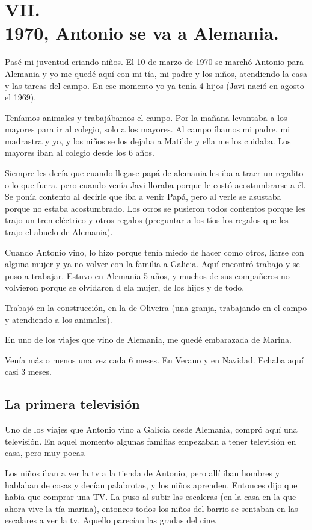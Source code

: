 \documentclass[12pt,a5paper]{book}
\begin{document}
\section*{VII.\\1970, Antonio se va a Alemania.}

Pasé mi juventud criando niños. El 10 de marzo de 1970 se marchó Antonio para Alemania y yo me quedé aquí con mi tía, mi padre y los niños, atendiendo la casa y las tareas del campo. En ese momento yo ya tenía 4 hijos (Javi nació en agosto el 1969).

Teníamos animales y trabajábamos el campo. Por la mañana levantaba a los mayores para ir al colegio, solo a los mayores. Al campo íbamos mi padre, mi madrastra y yo, y los niños se los dejaba a Matilde y ella me los cuidaba. Los mayores iban al colegio desde los 6 años.

Siempre les decía que cuando llegase papá de alemania les iba a traer un regalito o lo que fuera, pero cuando venía Javi lloraba porque le costó acostumbrarse a él. Se ponía contento al decirle que iba a venir Papá, pero al verle se asustaba porque no estaba acostumbrado. Los otros se pusieron todos contentos porque les trajo un tren eléctrico y otros regalos (preguntar a los tíos los regalos que les trajo el abuelo de Alemania). 

Cuando Antonio vino, lo hizo porque tenía miedo de hacer como otros, liarse con alguna mujer y ya no volver con la familia a Galicia. Aquí encontró trabajo y se puso a trabajar. Estuvo en Alemania 5 años, y muchos de sus compañeros no volvieron porque se olvidaron d ela mujer, de los hijos y de todo.

Trabajó en la construcción, en la de Oliveira (una granja, trabajando en el campo y atendiendo a los animales).

En uno de los viajes que vino de Alemania, me quedé embarazada de Marina.

Venía más o menos una vez cada 6 meses. En Verano y en Navidad. Echaba aquí casi 3 meses.


\subsection*{La primera televisión}

Uno de los viajes que Antonio vino a Galicia desde Alemania, compró aquí una televisión. En aquel momento algunas familias empezaban a tener televisión en casa, pero muy pocas.

Los niños iban a ver la tv a la tienda de Antonio, pero allí iban hombres y hablaban de cosas y decían palabrotas, y los niños aprenden. Entonces dijo que había que comprar una TV. La puso al subir las escaleras (en la casa en la que ahora vive la tía marina), entonces todos los niños del barrio  se sentaban en las escalares a ver la tv. Aquello parecían las gradas del cine. 
\end{document}
